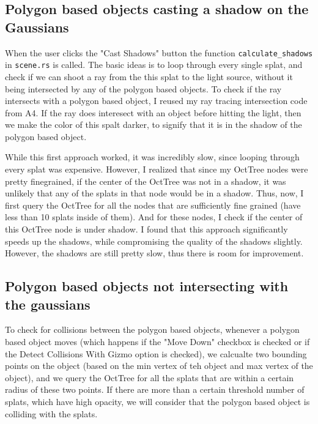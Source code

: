 \documentclass {article}
\begin{document}
\subsection{Polygon based objects casting a shadow on the Gaussians}

When the user clicks the "Cast Shadows" button the function \lstinline[style=inlinecode]{calculate_shadows} in \lstinline[style=inlinecode]{scene.rs} is called. The basic ideas is to loop through every single splat, and check if we can shoot a ray from the this splat to the light source, without it being intersected by any of the polygon based objects. To check if the ray intersects with a polygon based object, I reused my ray tracing intersection code from A4. If the ray does interesect with an object before hitting the light, then we make the color of this spalt darker, to signify that it is in the shadow of the polygon based object.


While this first approach worked, it was incredibly slow, since looping through every splat was expensive. However, I realized that since my OctTree nodes were pretty finegrained, if the center of the OctTree was not in a shadow, it was unlikely that any of the splats in that node would be in a shadow. Thus, now, I first query the OctTree for all the nodes that are sufficiently fine grained (have less than 10 splats inside of them). And for these nodes, I check if the center of this OctTree node is under shadow. I found that this approach significantly speeds up the shadows, while compromising the quality of the shadows slightly. However, the shadows are still pretty slow, thus there is room for improvement.

\subsection{Polygon based objects not intersecting with the gaussians}

To check for collisions between the polygon based objects, whenever a polygon based object moves (which happens if the "Move Down" checkbox is checked or if the Detect Collisions With Gizmo option is checked), we calcualte two bounding points on the object (based on the min vertex of teh object and max vertex of the object), and we query the OctTree for all the splats that are within a certain radius of these two points. If there are more than a certain threshold number of splats, which have high opacity, we will consider that the polygon based object is colliding with the splats.
\end{document}
